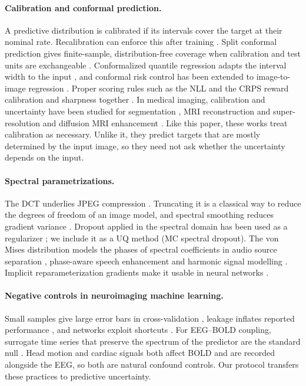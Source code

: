 \paragraph{Calibration and conformal prediction.} A predictive distribution is calibrated if its intervals cover the target at their nominal rate. Recalibration can enforce this after training \citep{kuleshov2018accurate}. Split conformal prediction gives finite-sample, distribution-free coverage when calibration and test units are exchangeable \citep{vovk2005algorithmic,lei2018distribution,angelopoulos2023gentle}. Conformalized quantile regression adapts the interval width to the input \citep{romano2019conformalized}, and conformal risk control has been extended to image-to-image regression \citep{angelopoulos2022image}. Proper scoring rules such as the NLL and the CRPS reward calibration and sharpness together \citep{gneiting2007strictly}. In medical imaging, calibration and uncertainty have been studied for segmentation \citep{mehrtash2020confidence}, MRI reconstruction and super-resolution \citep{narnhofer2021bayesian,zhang2019reducing} and diffusion MRI enhancement \citep{tanno2021uncertainty}. Like this paper, these works treat calibration as necessary. Unlike it, they predict targets that are mostly determined by the input image, so they need not ask whether the uncertainty depends on the input.

\paragraph{Spectral parametrizations.} The DCT \citep{ahmed1974discrete} underlies JPEG compression \citep{wallace1992jpeg}. Truncating it is a classical way to reduce the degrees of freedom of an image model, and spectral smoothing reduces gradient variance \citep{pervez2021spectral}. Dropout applied in the spectral domain has been used as a regularizer \citep{khan2019regularization}; we include it as a UQ method (MC spectral dropout). The von Mises distribution models the phases of spectral coefficients in audio source separation \citep{magron2018bayesian}, phase-aware speech enhancement \citep{gerkmann2014bayesian} and harmonic signal modelling \citep{kulmer2015harmonic}. Implicit reparameterization gradients make it usable in neural networks \citep{figurnov2018implicit}.

\paragraph{Negative controls in neuroimaging machine learning.} Small samples give large error bars in cross-validation \citep{varoquaux2018cross}, leakage inflates reported performance \citep{kapoor2023leakage}, and networks exploit shortcuts \citep{geirhos2020shortcut}. For EEG--BOLD coupling, surrogate time series that preserve the spectrum of the predictor are the standard null \citep{schreiber1996improved}. Head motion \citep{friston1996movement,power2014methods} and cardiac signals both affect BOLD and are recorded alongside the EEG, so both are natural confound controls. Our protocol transfers these practices to predictive uncertainty.
